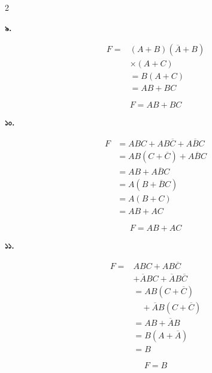 \begin{multicols}{2}
\medskip


\textbf{৯.}

\[
\begin{aligned}
F
={}&(A+B)(\overline A+B)\\
&\times(A+C)\\
&=B(A+C)\\
&=AB+BC
\end{aligned}
\]

\[
\boxed{F=AB+BC}
\]

\medskip


\textbf{১০.}

\[
\begin{aligned}
F
&=ABC+AB\overline C+A\overline BC\\
&=AB(C+\overline C)+A\overline BC\\
&=AB+A\overline BC\\
&=A(B+\overline BC)\\
&=A(B+C)\\
&=AB+AC
\end{aligned}
\]

\[
\boxed{F=AB+AC}
\]

\medskip


\textbf{১১.}

\[
\begin{aligned}
F
={}&ABC+AB\overline C\\
&+\overline ABC+\overline AB\overline C\\
&=AB(C+\overline C)\\
&\quad+\overline AB(C+\overline C)\\
&=AB+\overline AB\\
&=B(A+\overline A)\\
&=B
\end{aligned}
\]

\[
\boxed{F=B}
\]

\medskip



\end{multicols}
